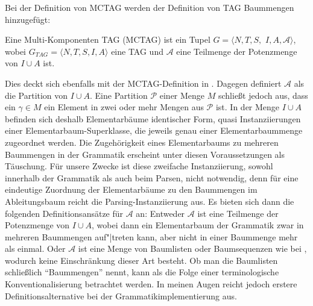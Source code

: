 Bei der Definition von MCTAG werden der Definition von TAG Baummengen hinzugefügt:
\begin{definition}[MCTAG]
Eine Multi-Komponenten TAG (MCTAG) ist ein Tupel \linebreak $G = \langle N,T,S,$ $I,A,\mathcal{A} \rangle$, wobei $G_{TAG} = \langle N,T,S,I,A\rangle$ eine TAG und $\mathcal{A}$ eine Teilmenge der Potenzmenge von $I \cup A$ ist.
\end{definition}
Dies deckt sich ebenfalls mit der MCTAG-Definition in \cite{Kallmeyer:05}. Dagegen definiert \cite{Kallmeyer:09} $\mathcal{A}$ als die Partition von $I \cup A$. Eine Partition $\mathcal{P}$ einer Menge $M$ schlie\ss t jedoch aus, dass ein  $\gamma \in M$ ein Element in zwei oder mehr Mengen aus $\mathcal{P}$ ist. In der Menge $I \cup A$ befinden sich deshalb Elementarbäume identischer Form, quasi Instanziierungen einer Elementarbaum-Superklasse, die jeweils genau einer Elementarbaummenge zugeordnet werden. Die Zugehörigkeit eines Elementarbaums zu mehreren Baummengen in der Grammatik erscheint unter diesen Voraussetzungen als Täuschung. Für unsere Zwecke ist diese zweifache Instanziierung, sowohl innerhalb der Grammatik als auch beim Parsen, nicht notwendig, denn für eine eindeutige Zuordnung der Elementarbäume zu den Baummengen im Ableitungsbaum reicht die Parsing-Instanziierung aus. Es bieten sich dann die folgenden Definitionsansätze für $\mathcal{A}$ an: Entweder $\mathcal{A}$ ist eine Teilmenge der Potenzmenge von $I \cup A$, wobei dann ein Elementarbaum der Grammatik zwar in mehreren Baummengen auf"|treten kann, aber nicht in einer Baummenge mehr als einmal. Oder $\mathcal{A}$ ist eine Menge von Baumlisten oder Baumsequenzen wie bei \cite{Weir:88}, wodurch keine Einschränkung dieser Art besteht. Ob man die Baumlisten schlie\ss lich "`Baummengen"' nennt, kann als die Folge einer terminologische Konventionalisierung betrachtet werden. In meinen Augen reicht jedoch erstere Definitionsalternative bei der Grammatikimplementierung aus.

